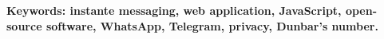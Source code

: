 \begin{comment}
	The use of instant messaging applications has become a vital component of interpersonal communication, especially for individuals who do not have the opportunity to interact on a daily basis. WhatsApp, one of the most popular instant messaging platforms, reported sending approximately 200 billion messages per day in October 2020, and currently has over 2 billion users.
	
	In 1992, Robin Dunbar proposed Dunbar's number, which approximates the number of people with whom an individual can maintain stable social relationships at around 150. Understanding the objective state of personal relationships within our social circles can be crucial for maintaining, preserving, and improving strong, lasting, and healthy relationships.
	
	This thesis presents the design and implementation of a web application that aims to provide users with a tool to analyze and understand their WhatsApp chats in a visual and easily comprehensible way. The application allows users to gain insights into their social interactions and relationships, taking into account Dunbar's number.
	
	Privacy is a major concern in the realm of personal conversations, and it has been considered a primary concern during the development of this application. To protect user data, the entire application is sent to the client, and all necessary operations are executed on the client's device. Additionally, the application is open-source, and the code is freely accessible for reading and modification by users and contributors under the \acrfull{gplv3} license.\cite{GPLv3} The application is built using React.
	
	Overall, this thesis presents the design and implementation of a web application that allows users to analyze their WhatsApp chats and gain insights into their social interactions and relationships, all while ensuring data privacy and accessibility under an open-source license.
\end{comment}

\vfill
\textbf{Keywords: instante messaging, web application, JavaScript, open-source software, WhatsApp, Telegram, privacy, Dunbar's number.} 